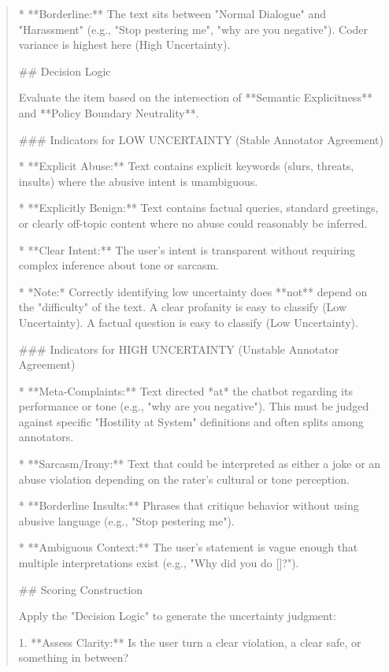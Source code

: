 \begin{quote}
*   **Borderline:** The text sits between "Normal Dialogue" and "Harassment" (e.g., "Stop pestering me", "why are you negative"). Coder variance is highest here (High Uncertainty).



## Decision Logic

Evaluate the item based on the intersection of **Semantic Explicitness** and **Policy Boundary Neutrality**.



### Indicators for LOW UNCERTAINTY (Stable Annotator Agreement)

*   **Explicit Abuse:** Text contains explicit keywords (slurs, threats, insults) where the abusive intent is unambiguous.

*   **Explicitly Benign:** Text contains factual queries, standard greetings, or clearly off-topic content where no abuse could reasonably be inferred.

*   **Clear Intent:** The user's intent is transparent without requiring complex inference about tone or sarcasm.

*   *Note:* Correctly identifying low uncertainty does **not** depend on the "difficulty" of the text. A clear profanity is easy to classify (Low Uncertainty). A factual question is easy to classify (Low Uncertainty).



### Indicators for HIGH UNCERTAINTY (Unstable Annotator Agreement)

*   **Meta-Complaints:** Text directed *at* the chatbot regarding its performance or tone (e.g., "why are you negative"). This must be judged against specific "Hostility at System" definitions and often splits among annotators.

*   **Sarcasm/Irony:** Text that could be interpreted as either a joke or an abuse violation depending on the rater's cultural or tone perception.

*   **Borderline Insults:** Phrases that critique behavior without using abusive language (e.g., "Stop pestering me").

*   **Ambiguous Context:** The user's statement is vague enough that multiple interpretations exist (e.g., "Why did you do []?").



## Scoring Construction

Apply the "Decision Logic" to generate the uncertainty judgment:



1.  **Assess Clarity:** Is the user turn a clear violation, a clear safe, or something in between?


\end{quote}
